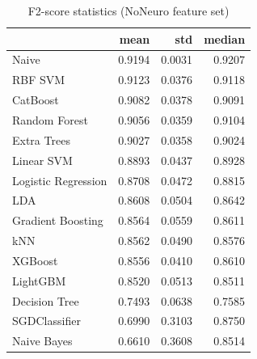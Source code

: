 \begin{table}
\caption{F2-score statistics (NoNeuro feature set)}
\label{tab:f2_NoNeuro_stats}
\begin{tabular}{lrrr}
\toprule
 & mean & std & median \\
\midrule
Naive & 0.9194 & 0.0031 & 0.9207 \\
RBF SVM & 0.9123 & 0.0376 & 0.9118 \\
CatBoost & 0.9082 & 0.0378 & 0.9091 \\
Random Forest & 0.9056 & 0.0359 & 0.9104 \\
Extra Trees & 0.9027 & 0.0358 & 0.9024 \\
Linear SVM & 0.8893 & 0.0437 & 0.8928 \\
Logistic Regression & 0.8708 & 0.0472 & 0.8815 \\
LDA & 0.8608 & 0.0504 & 0.8642 \\
Gradient Boosting & 0.8564 & 0.0559 & 0.8611 \\
kNN & 0.8562 & 0.0490 & 0.8576 \\
XGBoost & 0.8556 & 0.0410 & 0.8610 \\
LightGBM & 0.8520 & 0.0513 & 0.8511 \\
Decision Tree & 0.7493 & 0.0638 & 0.7585 \\
SGDClassifier & 0.6990 & 0.3103 & 0.8750 \\
Naive Bayes & 0.6610 & 0.3608 & 0.8514 \\
\bottomrule
\end{tabular}
\end{table}
